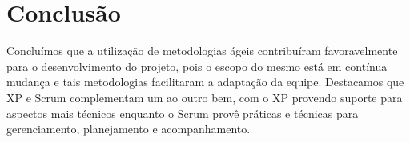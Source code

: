 \section{Conclusão}
\label{sec:conclusao}




Concluímos que a utilização de metodologias ágeis contribuíram favoravelmente para o desenvolvimento do projeto, pois o escopo do mesmo está em contínua mudança e tais metodologias facilitaram a adaptação da equipe. Destacamos que XP e Scrum complementam um ao outro bem, com o XP provendo suporte para aspectos mais técnicos enquanto o Scrum provê práticas e técnicas para gerenciamento, planejamento e acompanhamento.